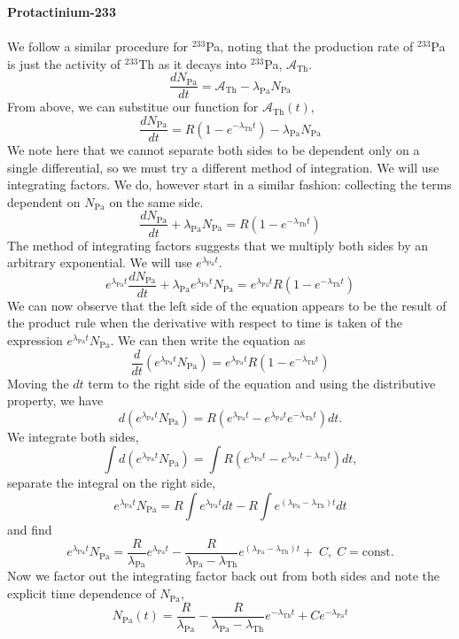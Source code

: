 \documentclass{report}
\begin{document}
\textbf{Protactinium-233}\\
\-\\
We follow a similar procedure for $^{233}$Pa, noting that the production rate of $^{233}$Pa is just the activity of $^{233}$Th as it decays into $^{233}$Pa, $\mathcal{A}_{\text{Th}}$.
$$\frac{dN_{\text{Pa}}}{dt} = \mathcal{A}_{\text{Th}} - \lambda_{\text{Pa}}N_{\text{Pa}}$$
From above, we can substitue our function for $\mathcal{A}_{\text{Th}}(t)$,
$$\frac{dN_{\text{Pa}}}{dt} = R(1-e^{-\lambda_{\text{Th}}t}) - \lambda_{\text{Pa}}N_{\text{Pa}}$$
We note here that we cannot separate both sides to be dependent only on a single differential, so we must try a different method of integration. We will use integrating factors. We do, however start in a similar fashion: collecting the terms dependent on $N_{\text{Pa}}$ on the same side.
$$ \frac{dN_{\text{Pa}}}{dt}+\lambda_{\text{Pa}}N_{\text{Pa}} = R(1-e^{-\lambda_{\text{Th}}t}) $$
The method of integrating factors suggests that we multiply both sides by an arbitrary exponential. We will use $e^{\lambda_{\text{Pa}}t}$.
$$ e^{\lambda_{\text{Pa}}t}\frac{dN_{\text{Pa}}}{dt} + \lambda_{\text{Pa}}e^{\lambda_{\text{Pa}}t}N_{\text{Pa}} = e^{\lambda_{\text{Pa}}t}R(1-e^{-\lambda_{\text{Th}}t}) $$
We can now observe that the left side of the equation appears to be the result of the product rule when the derivative with respect to time is taken of the expression $e^{\lambda_{\text{Pa}}t}N_{\text{Pa}}$. We can then write the equation as
$$\frac{d}{dt}(e^{\lambda_{\text{Pa}}t}N_{\text{Pa}}) = e^{\lambda_{\text{Pa}}t}R(1-e^{-\lambda_{\text{Th}}t})$$
Moving the $dt$ term to the right side of the equation and using the distributive property, we have
$$ d(e^{\lambda_{\text{Pa}}t}N_{\text{Pa}}) = R(e^{\lambda_{\text{Pa}}t}-e^{\lambda_{\text{Pa}}t}e^{-\lambda_{\text{Th}}t})dt .$$
We integrate both sides,
$$ \int{d(e^{\lambda_{\text{Pa}}t}N_{\text{Pa}})} = \int{ R(e^{\lambda_{\text{Pa}}t}-e^{\lambda_{\text{Pa}}t-\lambda_{\text{Th}}t})dt}, $$
separate the integral on the right side,
$$ e^{\lambda_{\text{Pa}}t}N_{\text{Pa}} = R\int{ e^{\lambda_{\text{Pa}}t}dt}-R\int{e^{(\lambda_{\text{Pa}}-\lambda_{\text{Th}})t}dt} $$
and find
$$e^{\lambda_{\text{Pa}}t}N_{\text{Pa}} = \frac{R}{\lambda_{\text{Pa}}}e^{\lambda_{\text{Pa}}t}-\frac{R}{\lambda_{\text{Pa}}-\lambda_{\text{Th}}}e^{(\lambda_{\text{Pa}}-\lambda_{\text{Th}})t} +\;C,\; C=\text{const.}$$
Now we factor out the integrating factor back out from both sides and note the explicit time dependence of $N_{\text{Pa}}$,
$$N_{\text{Pa}}(t) = \frac{R}{\lambda_{\text{Pa}}}-\frac{R}{\lambda_{\text{Pa}}-\lambda_{\text{Th}}}e^{-\lambda_{\text{Th}}t}+Ce^{-\lambda_{\text{Pa}}t}$$
\end{document}
